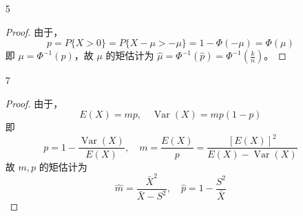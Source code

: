 \documentclass[normal,founder,mtpro2,cn]{elegantnote}
\begin{document}
\begin{enumerate}
\begin{proof}
\begin{enumerate}
                      故 $\theta,\mu$ 的矩估计为
                      \begin{equation*}
                          \hat{\theta}=\sqrt{S^2},\quad\hat{\mu}=\bar{X}-\sqrt{S^2}
                      \end{equation*}
            \end{enumerate}
        \end{proof}
    \item[5]
        \begin{proof}
            由于，
            \begin{equation*}
                p=P\{X>0\}=P\{X-\mu>-\mu\}=1-\Phi(-\mu)=\Phi(\mu)
            \end{equation*}
            即 $\mu=\Phi^{-1}(p)$，故 $\mu$ 的矩估计为 $\hat{\mu}=\Phi^{-1}(\hat{p})=\Phi^{-1}\left(\frac{k}{n}\right)$。
        \end{proof}
    \item[7]
        \begin{proof}
            由于，
            \begin{equation*}
                E(X)=mp,\quad\operatorname{Var}(X)=mp(1-p)
            \end{equation*}
            即
            \begin{equation*}
                p=1-\frac{\operatorname{Var}(X)}{E(X)},\quad m=\frac{E(X)}{p}=\frac{[E(X)]^{2}}{E(X)-\operatorname{Var}(X)}
            \end{equation*}
            故 $m,p$ 的矩估计为
            \begin{equation*}
                \hat{m}=\frac{\bar{X}^{2}}{\bar{X}-S^{2}},\quad\hat{p}=1-\frac{S^{2}}{\bar{X}}
            \end{equation*}
        \end{proof}
\end{enumerate}
\end{document}
